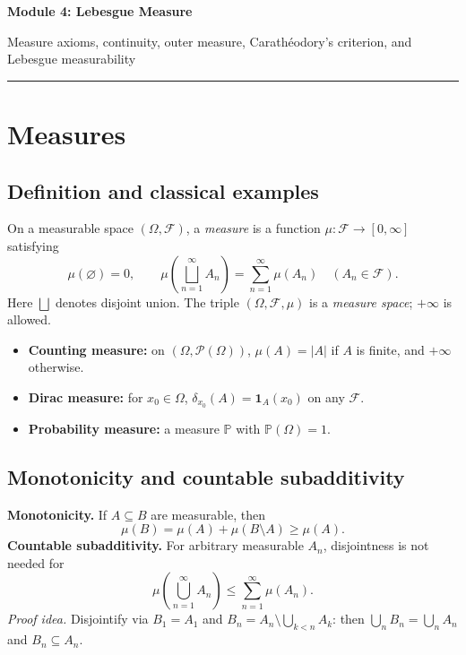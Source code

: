 \documentclass[10pt,a4paper]{article}
\begin{document}
\begin{center}
  {\LARGE\bfseries Module 4: Lebesgue Measure}\par
  \vspace{5pt}
  {\small\color{muted}Measure axioms, continuity, outer measure, Carath\'eodory's criterion, and Lebesgue measurability}\par
  \vspace{7pt}
  {\color{accent}\rule{0.88\linewidth}{0.7pt}}
\end{center}
\vspace{-4pt}

\section{Measures}
\subsection{Definition and classical examples}
On a measurable space $(\Omega,\mathcal F)$, a \emph{measure} is a function
$\mu:\mathcal F\to[0,\infty]$ satisfying
\[
\boxed{\mu(\varnothing)=0,\qquad
\mu\!\left(\bigsqcup_{n=1}^{\infty}A_n\right)
=\sum_{n=1}^{\infty}\mu(A_n)\quad(A_n\in\mathcal F).}
\]
Here $\bigsqcup$ denotes disjoint union. The triple
$(\Omega,\mathcal F,\mu)$ is a \emph{measure space}; $+\infty$ is allowed.
\begin{itemize}
\item \textbf{Counting measure:} on $(\Omega,\mathcal P(\Omega))$,
$\mu(A)=|A|$ if $A$ is finite, and $+\infty$ otherwise.
\item \textbf{Dirac measure:} for $x_0\in\Omega$,
$\delta_{x_0}(A)=\mathbf1_A(x_0)$ on any $\mathcal F$.
\item \textbf{Probability measure:} a measure $\mathbb P$ with
$\mathbb P(\Omega)=1$.
\end{itemize}

\subsection{Monotonicity and countable subadditivity}
\textbf{Monotonicity.} If $A\subseteq B$ are measurable, then
\[
\mu(B)=\mu(A)+\mu(B\setminus A)\ge\mu(A).
\]
\textbf{Countable subadditivity.} For arbitrary measurable $A_n$, disjointness
is not needed for
\[
\boxed{\mu\!\left(\bigcup_{n=1}^{\infty}A_n\right)
\le\sum_{n=1}^{\infty}\mu(A_n).}
\]
\emph{Proof idea.} Disjointify via $B_1=A_1$ and
$B_n=A_n\setminus\bigcup_{k<n}A_k$: then
$\bigcup_nB_n=\bigcup_nA_n$ and $B_n\subseteq A_n$.
\end{document}
